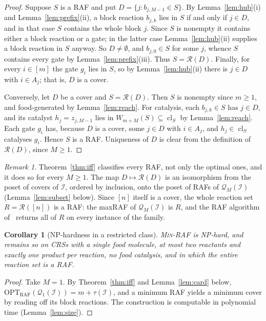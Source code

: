 \documentclass[11pt,a4paper]{article}
\theoremstyle{plain}
\newtheorem{corollary}[theorem]{Corollary}
\theoremstyle{definition}
\theoremstyle{remark}
\newtheorem{remark}[theorem]{Remark}
\newcommand{\cl}{\operatorname{cl}}
\newcommand{\OPT}{\mathrm{OPT}}
\newcommand{\RAF}{\mathrm{RAF}}
\newcommand{\optraf}{\OPT_{\RAF}}
\newcommand{\cQ}{\mathcal{Q}}
\newcommand{\cR}{\mathcal{R}}
\newcommand{\cI}{\mathcal{I}}
\newcommand{\tauI}{\tau(\cI)}
\newcommand{\MinRAF}{\textup{\textsc{Min-RAF}}}
\begin{document}
\begin{proof}
Suppose $S$ is a RAF and put $D=\{j: b_{j,M-1}\in S\}$. By Lemma~\ref{lem:hub}(i) and Lemma~\ref{lem:prefix}(ii), a block reaction $b_{j,k}$ lies in $S$ if and only if $j\in D$, and in that case $S$ contains the whole block $j$. Since $S$ is nonempty it contains either a block reaction or a gate; in the latter case Lemma~\ref{lem:hub}(ii) supplies a block reaction in $S$ anyway. So $D\ne\emptyset$, and $b_{j,0}\in S$ for some $j$, whence $S$ contains every gate by Lemma~\ref{lem:prefix}(iii). Thus $S=\cR(D)$. Finally, for every $i\in[m]$ the gate $g_i$ lies in $S$, so by Lemma~\ref{lem:hub}(ii) there is $j\in D$ with $i\in A_j$; that is, $D$ is a cover.

Conversely, let $D$ be a cover and $S=\cR(D)$. Then $S$ is nonempty since $m\ge 1$, and food-generated by Lemma~\ref{lem:reach}. For catalysis, each $b_{j,k}\in S$ has $j\in D$, and its catalyst $h_j=z_{j,M-1}$ lies in $W_{m+M}(S)\subseteq\cl_S$ by Lemma~\ref{lem:reach}. Each gate $g_i$ has, because $D$ is a cover, some $j\in D$ with $i\in A_j$, and $h_j\in\cl_S$ catalyses $g_i$. Hence $S$ is a RAF. Uniqueness of $D$ is clear from the definition of $\cR(D)$, since $M\ge 1$.
\end{proof}

\begin{remark}\label{rem:structure}
Theorem~\ref{thm:iff} classifies every RAF, not only the optimal ones, and it does so for every $M\ge 1$. The map $D\mapsto\cR(D)$ is an isomorphism from the poset of covers of $\cI$, ordered by inclusion, onto the poset of RAFs of $\cQ_M(\cI)$ (Lemma~\ref{lem:subset} below). Since $[n]$ itself is a cover, the whole reaction set $R=\cR([n])$ is a RAF: the maxRAF of $\cQ_M(\cI)$ is $R$, and the RAF algorithm of~\cite{hordijk2004detecting} returns all of $R$ on every instance of the family.
\end{remark}

\begin{corollary}[NP-hardness in a restricted class]\label{cor:np-hard}
\MinRAF{} is NP-hard, and remains so on CRSs with a single food molecule, at most two reactants and exactly one product per reaction, no food catalysis, and in which the entire reaction set is a RAF.
\end{corollary}

\begin{proof}
Take $M=1$. By Theorem~\ref{thm:iff} and Lemma~\ref{lem:card} below, $\optraf(\cQ_1(\cI))=m+\tauI$, and a minimum RAF yields a minimum cover by reading off its block reactions. The construction is computable in polynomial time (Lemma~\ref{lem:size}).
\end{proof}
\end{document}
